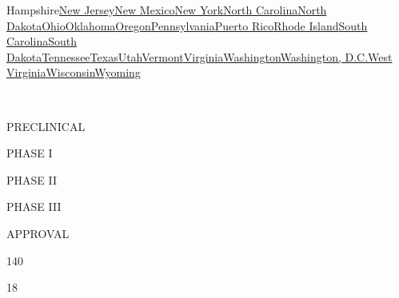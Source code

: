 {Hampshire}\href{https://www.nytimes.com/interactive/2020/us/new-jersey-coronavirus-cases.html}{New
Jersey}\href{https://www.nytimes.com/interactive/2020/us/new-mexico-coronavirus-cases.html}{New
Mexico}\href{https://www.nytimes.com/interactive/2020/us/new-york-coronavirus-cases.html}{New
York}\href{https://www.nytimes.com/interactive/2020/us/north-carolina-coronavirus-cases.html}{North
Carolina}\href{https://www.nytimes.com/interactive/2020/us/north-dakota-coronavirus-cases.html}{North
Dakota}\href{https://www.nytimes.com/interactive/2020/us/ohio-coronavirus-cases.html}{Ohio}\href{https://www.nytimes.com/interactive/2020/us/oklahoma-coronavirus-cases.html}{Oklahoma}\href{https://www.nytimes.com/interactive/2020/us/oregon-coronavirus-cases.html}{Oregon}\href{https://www.nytimes.com/interactive/2020/us/pennsylvania-coronavirus-cases.html}{Pennsylvania}\href{https://www.nytimes.com/interactive/2020/us/puerto-rico-coronavirus-cases.html}{Puerto
Rico}\href{https://www.nytimes.com/interactive/2020/us/rhode-island-coronavirus-cases.html}{Rhode
Island}\href{https://www.nytimes.com/interactive/2020/us/south-carolina-coronavirus-cases.html}{South
Carolina}\href{https://www.nytimes.com/interactive/2020/us/south-dakota-coronavirus-cases.html}{South
Dakota}\href{https://www.nytimes.com/interactive/2020/us/tennessee-coronavirus-cases.html}{Tennessee}\href{https://www.nytimes.com/interactive/2020/us/texas-coronavirus-cases.html}{Texas}\href{https://www.nytimes.com/interactive/2020/us/utah-coronavirus-cases.html}{Utah}\href{https://www.nytimes.com/interactive/2020/us/vermont-coronavirus-cases.html}{Vermont}\href{https://www.nytimes.com/interactive/2020/us/virginia-coronavirus-cases.html}{Virginia}\href{https://www.nytimes.com/interactive/2020/us/washington-coronavirus-cases.html}{Washington}\href{https://www.nytimes.com/interactive/2020/us/washington-dc-coronavirus-cases.html}{Washington,
D.C.}\href{https://www.nytimes.com/interactive/2020/us/west-virginia-coronavirus-cases.html}{West
Virginia}\href{https://www.nytimes.com/interactive/2020/us/wisconsin-coronavirus-cases.html}{Wisconsin}\href{https://www.nytimes.com/interactive/2020/us/wyoming-coronavirus-cases.html}{Wyoming}

~

PRECLINICAL

PHASE I

PHASE II

PHASE III

APPROVAL

140

18

